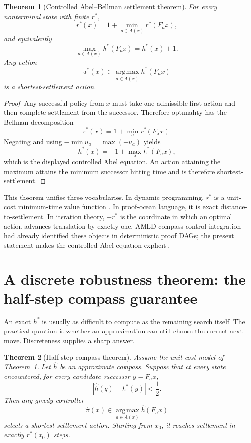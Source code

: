 \documentclass[11pt]{article}
\newtheorem{theorem}{Theorem}[section]
\theoremstyle{definition}
\theoremstyle{remark}
\newcommand{\argmaxop}{\operatorname*{arg\,max}}
\begin{document}
\begin{theorem}[Controlled Abel--Bellman settlement theorem]\label{thm:abelbellman}
For every nonterminal state with finite $r^*$,
\[
r^*(x)=1+\min_{a\in A(x)}r^*(F_a x),
\]
and equivalently
\[
\boxed{\max_{a\in A(x)}h^*(F_a x)=h^*(x)+1.}
\]
Any action
\[
a^*(x)\in\argmaxop_{a\in A(x)} h^*(F_a x)
\]
is a shortest-settlement action.
\end{theorem}

\begin{proof}
Any successful policy from $x$ must take one admissible first action and then complete settlement from the successor. Therefore optimality has the Bellman decomposition
\[
r^*(x)=1+\min_a r^*(F_a x).
\]
Negating and using $-\min u_a=\max(-u_a)$ yields
\[
h^*(x)=-1+\max_a h^*(F_a x),
\]
which is the displayed controlled Abel equation. An action attaining the maximum attains the minimum successor hitting time and is therefore shortest-settlement.
\end{proof}

This theorem unifies three vocabularies. In dynamic programming, $r^*$ is a unit-cost minimum-time value function \cite{Bellman}. In proof-ocean language, it is exact distance-to-settlement. In iteration theory, $-r^*$ is the coordinate in which an optimal action advances translation by exactly one. AMLD compass-control integration had already identified these objects in deterministic proof DAGs; the present statement makes the controlled Abel equation explicit \cite{CompassControl}.

\section{A discrete robustness theorem: the half-step compass guarantee}

An exact $h^*$ is usually as difficult to compute as the remaining search itself. The practical question is whether an approximation can still choose the correct next move. Discreteness supplies a sharp answer.

\begin{theorem}[Half-step compass theorem]\label{thm:halfstep}
Assume the unit-cost model of Theorem~\ref{thm:abelbellman}. Let $\widehat h$ be an approximate compass. Suppose that at every state encountered, for every candidate successor $y=F_a x$,
\[
|\widehat h(y)-h^*(y)|<\frac12.
\]
Then any greedy controller
\[
\widehat\pi(x)\in\argmaxop_{a\in A(x)}\widehat h(F_a x)
\]
selects a shortest-settlement action. Starting from $x_0$, it reaches settlement in exactly $r^*(x_0)$ steps.
\end{theorem}
\end{document}
